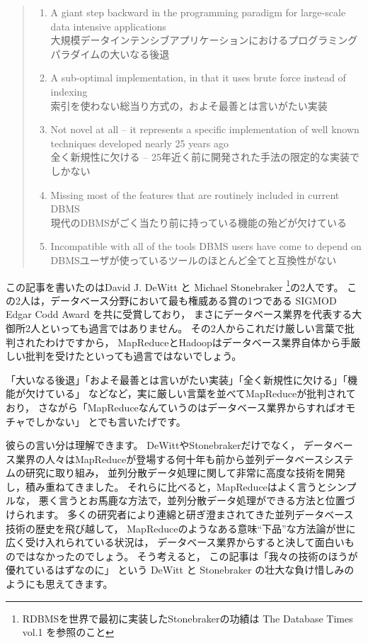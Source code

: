 \begin{quote}
\begin{enumerate}
 \item A giant step backward in the programming paradigm for large-scale data intensive applications \\
	   大規模データインテンシブアプリケーションにおけるプログラミングパラダイムの大いなる後退
 \item A sub-optimal implementation, in that it uses brute force instead of indexing \\
	   索引を使わない総当り方式の，およそ最善とは言いがたい実装
 \item Not novel at all -- it represents a specific implementation of well known techniques developed nearly 25 years ago \\
	   全く新規性に欠ける -- 25年近く前に開発された手法の限定的な実装でしかない
 \item Missing most of the features that are routinely included in current DBMS \\
	   現代のDBMSがごく当たり前に持っている機能の殆どが欠けている
 \item Incompatible with all of the tools DBMS users have come to depend on \\
	   DBMSユーザが使っているツールのほとんど全てと互換性がない
\end{enumerate}
\end{quote}

この記事を書いたのはDavid J. DeWitt と Michael Stonebraker \footnote{RDBMSを世界で最初に実装したStonebrakerの功績は The Database Times vol.1 を参照のこと}の2人です。
この2人は，データベース分野において最も権威ある賞の1つである SIGMOD Edgar Codd Award を共に受賞しており，
まさにデータベース業界を代表する大御所2人といっても過言ではありません。
その2人からこれだけ厳しい言葉で批判されたわけですから，
MapReduceとHadoopはデータベース業界自体から手厳しい批判を受けたといっても過言ではないでしょう。

「大いなる後退」「およそ最善とは言いがたい実装」「全く新規性に欠ける」「機能が欠けている」
などなど，実に厳しい言葉を並べてMapReduceが批判されており，
さながら「MapReduceなんていうのはデータベース業界からすればオモチャでしかない」
とでも言いたげです。

彼らの言い分は理解できます。
DeWittやStonebrakerだけでなく，
データベース業界の人々はMapReduceが登場する何十年も前から並列データベースシステムの研究に取り組み，
並列分散データ処理に関して非常に高度な技術を開発し，積み重ねてきました。
それらに比べると，MapReduceはよく言うとシンプルな，
悪く言うとお馬鹿な方法で，並列分散データ処理ができる方法と位置づけられます。
多くの研究者により連綿と研ぎ澄まされてきた並列データベース技術の歴史を飛び越して，
MapReduceのようなある意味``下品''な方法論が世に広く受け入れられている状況は，
データベース業界からすると決して面白いものではなかったのでしょう。
そう考えると，
この記事は「我々の技術のほうが優れているはずなのに」
という DeWitt と Stonebraker の壮大な負け惜しみのようにも思えてきます。

